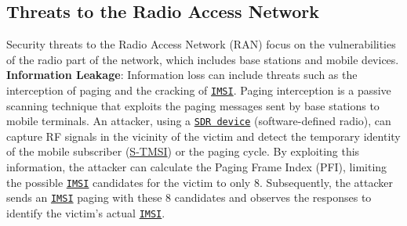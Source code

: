 \documentclass[english]{article}
\begin{document}
\subsection{Threats to the Radio Access Network}
Security threats to the Radio Access Network (RAN) focus on the vulnerabilities
of the radio part of the network, which includes base stations and mobile
devices.
\\[0.2cm]
\textbf{Information Leakage}:
Information loss can include threats such as the interception of
paging and the cracking of \texttt{\hyperlink{IMSI}{IMSI}}. Paging
interception is a passive scanning technique that exploits the
paging messages sent by base stations to mobile terminals. An
attacker, using a \texttt{\hyperlink{SDR}{SDR device}}
(software-defined radio), can capture RF signals in the vicinity
of the victim and detect the temporary identity of the mobile
subscriber (\hyperlink{S-TMSI}{S-TMSI}) or the paging cycle. By
exploiting this information, the attacker can calculate the
Paging Frame Index (PFI), limiting the possible \texttt{\hyperlink{IMSI}{IMSI}} candidates
for the victim to only 8. Subsequently, the attacker sends an
\texttt{\hyperlink{IMSI}{IMSI}} paging with these 8 candidates and observes the responses
to identify the victim's actual \texttt{\hyperlink{IMSI}{IMSI}}.
\\[0.2cm]
\end{document}
